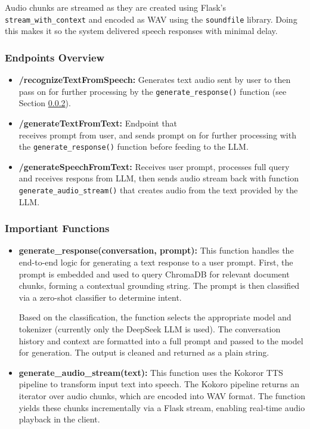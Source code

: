 \documentclass[twocolumn]{article}
\begin{document}
Audio chunks are streamed as they are created using Flask's \texttt{stream\_with\_context} and encoded as WAV using the \texttt{soundfile}\cite{soundfile} library. Doing this makes it so the system delivered speech responses with minimal delay.

\subsubsection{Endpoints Overview}
\begin{itemize}
    \item \textbf{/recognizeTextFromSpeech:} Generates text audio sent by user to then pass on for further processing by the \texttt{generate\_response()} function (see Section \ref{sec:functions}).
    \item \textbf{/generateTextFromText:} Endpoint that\\ receives prompt from user, and sends prompt on for further processing with the \texttt{generate\_response()} function before feeding to the LLM.
    \item \textbf{/generateSpeechFromText:} Receives user prompt, processes full query and receives respons from LLM, then sends audio stream back with function \texttt{generate\_audio\_stream()} that creates audio from the text provided by the LLM.
\end{itemize}

\subsubsection{Importiant Functions}
\label{sec:functions}
\begin{itemize}
    \item \textbf{generate\_response(conversation, prompt):} This function handles the end-to-end logic for generating a text response to a user prompt. First, the prompt is embedded and used to query ChromaDB for relevant document chunks, forming a contextual grounding string. The prompt is then classified via a zero-shot classifier to determine intent.

    Based on the classification, the function selects the appropriate model and tokenizer (currently only the DeepSeek LLM is used). The conversation history and context are formatted into a full prompt and passed to the model for generation. The output is cleaned and returned as a plain string.
    \item \textbf{generate\_audio\_stream(text):} This function uses the Kokoror TTS pipeline to transform input text into speech. The Kokoro pipeline returns an iterator over audio chunks, which are encoded into WAV format. The function yields these chunks incrementally via a Flask stream, enabling real-time audio playback in the client.
\end{itemize}
\end{document}

